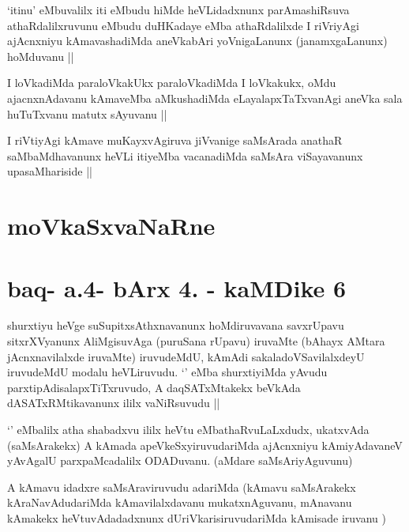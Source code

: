 \begin{artha}
`itinu' eMbuvalilx iti eMbudu hiMde heVLidadxnunx parAmashiRsuva
  athaRdalilxruvunu eMbudu duHKadaye eMba athaRdalilxde I riVriyAgi
  ajAcnxniyu kAmavashadiMda aneVkabAri yoVnigaLanunx (janamxgaLanunx)
  hoMduvanu ||
\end{artha}


\begin{artha}
I loVkadiMda paraloVkakUkx paraloVkadiMda I loVkakukx, oMdu
ajacnxnAdavanu kAmaveMba aMkushadiMda eLayalapxTaTxvanAgi aneVka sala
huTuTxvanu matutx sAyuvanu ||
\end{artha}

\begin{artha}
I riVtiyAgi kAmave muKayxvAgiruva jiVvanige saMsArada anathaR
saMbaMdhavanunx heVLi itiyeMba vacanadiMda saMsAra viSayavanunx
upasaMhariside ||
\end{artha}

\section*{moVkaSxvaNaRne}

\section*{baq- a.4- bArx 4. - kaMDike 6}

\stext


\begin{artha}
shurxtiyu heVge suSupitxsAthxnavanunx hoMdiruvavana savxrUpavu
sitxrXVyanunx AliMgisuvAga (puruSana rUpavu) iruvaMte (bAhayx AMtara
jAcnxnavilalxde iruvaMte) iruvudeMdU, kAmAdi sakaladoVSavilalxdeyU
iruvudeMdU modalu heVLiruvudu. `\stext' eMba shurxtiyiMda yAvudu
parxtipAdisalapxTiTxruvudo, A daqSATxMtakekx beVkAda
dASATxRMtikavanunx ililx vaNiRsuvudu ||
\end{artha}

\begin{artha}
`\stext' eMbalilx atha shabadxvu ililx heVtu eMbathaRvuLaLxdudx,
  ukatxvAda (saMsArakekx) A kAmada apeVkeSxyiruvudariMda ajAcnxniyu
  kAmiyAdavaneV yAvAgalU parxpaMcadalilx ODADuvanu. (aMdare saMsAriyAguvunu)
\end{artha}

\begin{artha}
A kAmavu idadxre saMsAraviruvudu adariMda (kAmavu saMsArakekx
kAraNavAdudariMda kAmavilalxdavanu mukatxnAguvanu, mAnavanu kAmakekx
heVtuvAdadadxnunx dUriVkarisiruvudariMda kAmisade iruvanu )
\end{artha}

